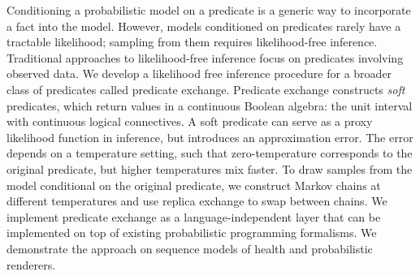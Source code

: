 









Conditioning a probabilistic model on a predicate is a generic way to incorporate a fact into the model.
However, models conditioned on predicates rarely have a tractable likelihood; sampling from them requires likelihood-free inference.
Traditional approaches to likelihood-free 
inference focus on predicates involving observed data.
We develop a likelihood free inference procedure for a broader class of
predicates called predicate exchange. 
Predicate exchange constructs \emph{soft} predicates, which return values in a continuous Boolean algebra: the unit interval with continuous logical connectives.
A soft predicate can serve as a proxy likelihood function in inference,
but introduces an approximation error.
The error depends on a temperature setting, such that zero-temperature corresponds to the original predicate, but higher temperatures mix faster.
To draw samples from the model conditional on the original predicate,
we construct Markov chains at different temperatures and use 
replica exchange to swap between chains.
We implement predicate exchange as a language-independent layer
that can be implemented on top of existing probabilistic programming formalisms. 
We demonstrate the approach on sequence models of health and probabilistic renderers.



% 